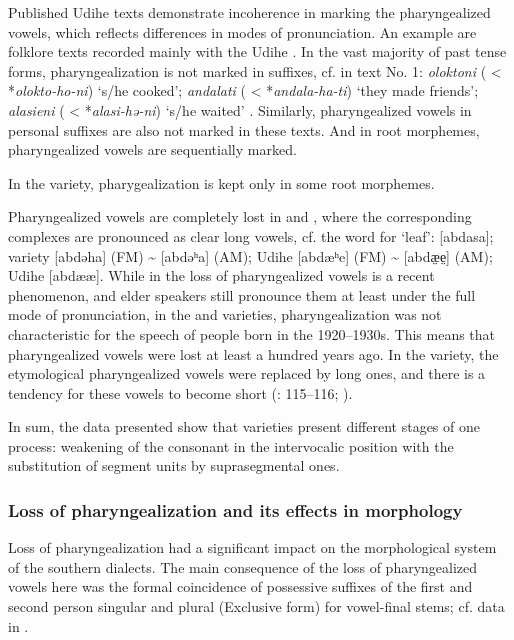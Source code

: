 \documentclass[output=paper,colorlinks,citecolor=brown]{langscibook}
\begin{document}
Published  Udihe texts demonstrate incoherence in marking the pharyngealized vowels, which reflects differences in modes of pronunciation. An example are folklore texts recorded mainly with the  Udihe \citep{Simonovetal1998}. In the vast majority of past tense forms, pharyngealization is not marked in suffixes, cf. in text No. 1: \textit{oloktoni} ( < *\textit{olokto-ho-ni}) ‘s/he cooked’; \textit{andalati} ( < *\textit{andala-ha-ti}) ‘they made friends’; \textit{alasieni} ( < *\textit{alasi-h{ə}-ni}) ‘s/he waited’ \citep[74]{Simonovetal1998}. Similarly, pharyngealized vowels in personal suffixes are also not marked in these texts. And in root morphemes, pharyngealized vowels are sequentially marked.


In the  variety, pharygealization is kept only in some root morphemes. 


Pharyngealized vowels are completely lost in  and , where the corresponding complexes are pronounced as clear long vowels, cf. the word for ‘leaf’:  [abdasa];  variety [abd{ə}ha] (FM) {\textasciitilde} [abd{ə}ʰa] (AM);  Udihe [abdæʰe] (FM) {\textasciitilde} [abdæ{̤}e{̤}] (AM);  Udihe [abdææ]. While in  the loss of pharyngealized vowels is a recent phenomenon, and elder speakers still pronounce them at least under the full mode of pronunciation, in the  and  varieties, pharyngealization was not characteristic for the speech of people born in the 1920--1930s. This means that pharyngealized vowels were lost at least a hundred years ago. In the  variety, the etymological pharyngealized vowels were replaced by long ones, and there is a tendency for these vowels to become short (\citealt{Nikolaeva2000}: 115--116; \citealt{Tsumagari2012}). 

In sum, the data presented show that  varieties present different stages of one process: weakening of the consonant in the intervocalic position with the substitution of segment units by suprasegmental ones.

\subsubsection{Loss of pharyngealization and its effects in morphology}

Loss of pharyngealization had a significant impact on the morphological system of the southern dialects. The main consequence of the loss of pharyngealized vowels here was the formal coincidence of possessive suffixes of the first and second person singular and plural (Exclusive form) for vowel-final stems; cf. data in . 
\end{document}
